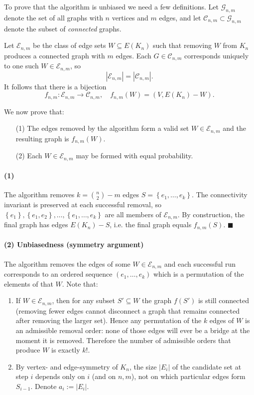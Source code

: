 \documentclass[11pt,a4paper]{article}
\begin{document}
To prove that the algorithm is unbiased we need a few definitions. Let
$\mathcal{G}_{n,m}$ denote the set of all graphs with $n$ vertices and $m$
edges, and let $\mathcal{C}_{n,m} \subset \mathcal{G}_{n,m}$ denote the subset
of \emph{connected} graphs. 

Let $\mathcal{E}_{n,m}$ be the class of edge sets $W \subseteq E(K_n)$ such that
removing $W$ from $K_n$ produces a connected graph with $m$ edges. 
Each $G \in \mathcal{C}_{n,m}$ corresponds uniquely to one such $W \in
\mathcal{E}_{n,m}$, so
\[
    |\mathcal{E}_{n,m}| = \left| \mathcal{C}_{n, m}\right| .
\]
It follows that there is a bijection
\[
f_{n,m} : \mathcal{E}_{n,m} \to \mathcal{C}_{n,m},
\quad
f_{n,m}(W) = (V, E( K_n ) - W).
\]

We now prove that:
\begin{enumerate}
    \item[(1)] The edges removed by the algorithm form a valid set $W \in
        \mathcal{E}_{n,m}$ and the resulting graph is $f_{n,m}(W)$.
    \item[(2)] Each $W \in \mathcal{E}_{n,m}$ may be formed with equal probability.
\end{enumerate}

\paragraph{(1)}
The algorithm removes $k = \binom{n}{2} - m$ edges $S = \left\{ e_1, \ldots, e_k
\right\} $. The
connectivity invariant is preserved at each successful removal, so 
$\left\{ e_1 \right\}, \left\{ e_1, e_2 \right\}, \ldots, \left\{ e_1, \ldots,
e_k \right\}   $ are all members of $\mathcal{E}_{n, m}$. By construction, the
final graph has edges $E(K_n) - S$, i.e. the final graph equals \(f_{n,m}(S)\).
$\blacksquare$

\paragraph{(2) Unbiasedness (symmetry argument)}
The algorithm removes the edges of some \(W \in \mathcal{E}_{n,m}\) and each
successful run corresponds to an ordered sequence \((e_1,\dots,e_k)\) which is a
permutation of the elements of that \(W\). Note that:

\begin{enumerate}
  \item If \(W\in\mathcal{E}_{n,m}\), then for any subset \(S'\subseteq W\)
  the graph \(f(S')\) is still connected (removing fewer edges
  cannot disconnect a graph that remains connected after removing the larger set).
  Hence any permutation of the \(k\) edges of \(W\) is an admissible removal
  order: none of those edges will ever be a bridge at the moment it is
  removed. Therefore the number of admissible orders that produce \(W\) is
  exactly \(k!\).
  \item By vertex- and edge-symmetry of \(K_n\), the size \(|E_i|\) of the
  candidate set at step \(i\) depends only on \(i\) (and on \(n,m\)), not on
  which particular edges form \(S_{i-1}\). Denote \(a_i:=|E_i|\).
\end{enumerate}
\end{document}
